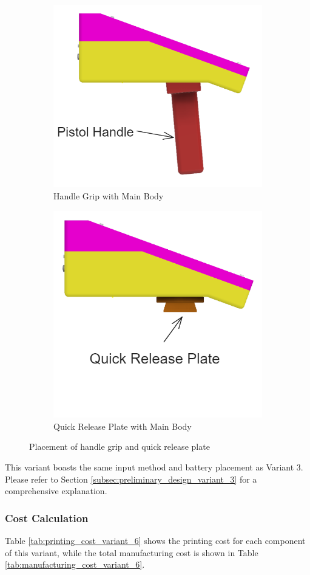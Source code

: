 \begin{figure}[!ht]
    \centering
    \begin{subfigure}[c]{0.47\textwidth}
        \begin{minipage}{\textwidth}
            \centering
            \includegraphics[height=4 cm]{texs/Part1/chapter4/image/v63.png}
        \end{minipage}
        \caption{Handle Grip with Main Body}
        \label{fig:variant6_handle_grip_main_body}
    \end{subfigure}
    \begin{subfigure}[c]{0.5\textwidth}
        \begin{minipage}{\textwidth}
            \centering
            \includegraphics[height=4 cm]{texs/Part1/chapter4/image/v64.png}
        \end{minipage}
        \caption{Quick Release Plate with Main Body}
        \label{fig:variant6_quick_release_plate_main_body}
    \end{subfigure}
    \caption{Placement of handle grip and quick release plate}
    \label{fig:variant6_handle_grip_quick_release_plate}
\end{figure}

This variant boasts the same input method and battery placement as Variant 3. Please refer to Section \ref{subsec:preliminary_design_variant_3} for a comprehensive explanation.

\subsubsection{Cost Calculation}
Table \ref{tab:printing_cost_variant_6} shows the printing cost for each component of this variant, while the total manufacturing cost is shown in Table \ref{tab:manufacturing_cost_variant_6}.

